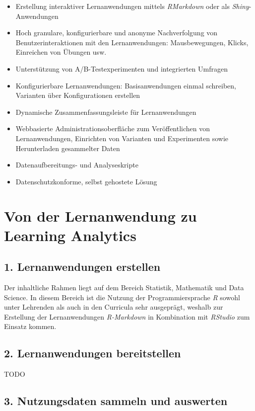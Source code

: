 \documentclass[a0,portrait]{a0poster}
\begin{document}
\begin{multicols}{2}
\begin{itemize}
    \item Erstellung interaktiver Lernanwendungen mittels \textit{RMarkdown} oder als \textit{Shiny}-Anwendungen
    \item Hoch granulare, konfigurierbare und anonyme Nachverfolgung von Benutzerinteraktionen mit den Lernanwendungen: Mausbewegungen, Klicks, Einreichen von Übungen usw.
    \item Unterstützung von A/B-Testexperimenten und integrierten Umfragen
    \item Konfigurierbare Lernanwendungen: Basisanwendungen einmal schreiben, Varianten über Konfigurationen erstellen
    \item Dynamische Zusammenfassungsleiste für Lernanwendungen
    \item Webbasierte Administrationsoberfläche zum Veröffentlichen von Lernanwendungen, Einrichten von Varianten und Experimenten sowie Herunterladen gesammelter Daten
    \item Datenaufbereitungs- und Analyseskripte
    \item Datenschutzkonforme, selbst gehostete Lösung
\end{itemize}

\section*{Von der Lernanwendung zu Learning Analytics}

\subsection*{1. Lernanwendungen erstellen}

Der inhaltliche Rahmen liegt auf dem Bereich Statistik, Mathematik und Data Science. In diesem Bereich ist die Nutzung der Programmiersprache \textit{R} sowohl unter Lehrenden als auch in den Curricula sehr ausgeprägt, weshalb zur Erstellung der Lernanwendungen \textit{R-Markdown} in Kombination mit \textit{RStudio} zum Einsatz kommen.

\subsection*{2. Lernanwendungen bereitstellen}

TODO

\subsection*{3. Nutzungsdaten sammeln und auswerten}


\end{multicols}
\end{document}

